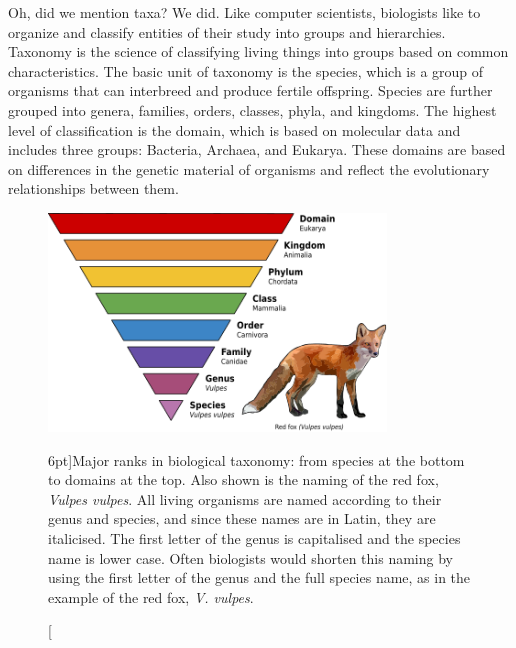 Oh, did we mention taxa? We did. Like computer scientists, biologists like to organize and classify entities of their study into groups and hierarchies. Taxonomy is the science of classifying living things into groups based on common characteristics. The basic unit of taxonomy is the species, which is a group of organisms that can interbreed and produce fertile offspring. Species are further grouped into genera, families, orders, classes, phyla, and kingdoms. The highest level of classification is the domain,
which is based on molecular data and includes three groups: Bacteria, Archaea, and Eukarya. These domains are based on differences in the genetic material of organisms and reflect the evolutionary relationships between them.

\begin{figure}
  \includegraphics[width=0.8\textwidth]{figs/molbiol/taxonomy.png}
  \caption[][6pt]{Major ranks in biological taxonomy: from species at the bottom to domains at the top. Also shown is the naming of the red fox, \textit{Vulpes vulpes}. All living organisms are named according to their genus and species, and since these names are in Latin, they are italicised. The first letter of the genus is capitalised and the species name is lower case. Often biologists would shorten this naming by using the first letter of the genus and the full species name, as in the example of the red fox, \textit{V. vulpes}.}
  \label{fig:taxonomy}
\end{figure}


